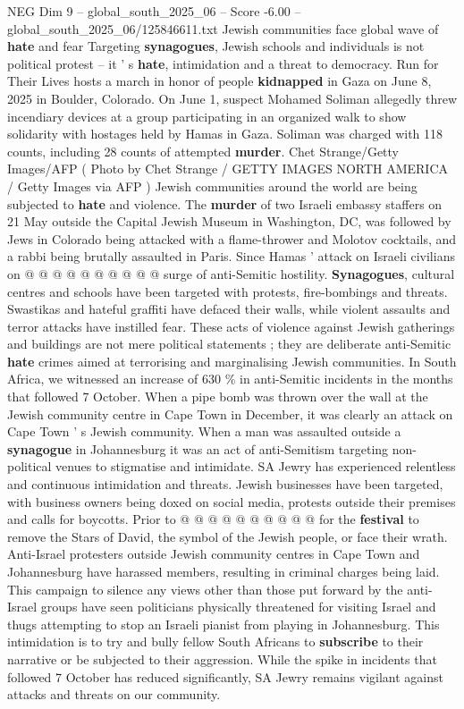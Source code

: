 \begin{textsample}{NEG Dim 9 – global\_south\_2025\_06 – Score -6.00 – global\_south\_2025\_06/125846611.txt}  \label{ex:f9_neg_252}
Jewish communities face global wave of \textbf{hate} and fear Targeting \textbf{synagogues}, Jewish schools and individuals is not political protest -- it ' s \textbf{hate}, intimidation and a threat to democracy.
Run for Their Lives hosts a march in honor of people \textbf{kidnapped} in Gaza on June 8, 2025 in Boulder, Colorado.
On June 1, suspect Mohamed Soliman allegedly threw incendiary devices at a group participating in an organized walk to show solidarity with hostages held by Hamas in Gaza.
Soliman was charged with 118 counts, including 28 counts of attempted \textbf{murder}.
Chet Strange/Getty Images/AFP ( Photo by Chet Strange / GETTY IMAGES NORTH AMERICA / Getty Images via AFP ) Jewish communities around the world are being subjected to \textbf{hate} and violence.
The \textbf{murder} of two Israeli embassy staffers on 21 May outside the Capital Jewish Museum in Washington, DC, was followed by Jews in Colorado being attacked with a flame-thrower and Molotov cocktails, and a rabbi being brutally assaulted in Paris.
Since Hamas ' attack on Israeli civilians on @ @ @ @ @ @ @ @ @ @ surge of anti-Semitic hostility. \textbf{Synagogues}, cultural centres and schools have been targeted with protests, fire-bombings and threats.
Swastikas and hateful graffiti have defaced their walls, while violent assaults and terror attacks have instilled fear.
These acts of violence against Jewish gatherings and buildings are not mere political statements ; they are deliberate anti-Semitic \textbf{hate} crimes aimed at terrorising and marginalising Jewish communities.
In South Africa, we witnessed an increase of 630 \% in anti-Semitic incidents in the months that followed 7 October.
When a pipe bomb was thrown over the wall at the Jewish community centre in Cape Town in December, it was clearly an attack on Cape Town ' s Jewish community.
When a man was assaulted outside a \textbf{synagogue} in Johannesburg it was an act of anti-Semitism targeting non-political venues to stigmatise and intimidate.
SA Jewry has experienced relentless and continuous intimidation and threats.
Jewish businesses have been targeted, with business owners being doxed on social media, protests outside their premises and calls for boycotts.
Prior to @ @ @ @ @ @ @ @ @ @ for the \textbf{festival} to remove the Stars of David, the symbol of the Jewish people, or face their wrath.
Anti-Israel protesters outside Jewish community centres in Cape Town and Johannesburg have harassed members, resulting in criminal charges being laid.
This campaign to silence any views other than those put forward by the anti-Israel groups have seen politicians physically threatened for visiting Israel and thugs attempting to stop an Israeli pianist from playing in Johannesburg.
This intimidation is to try and bully fellow South Africans to \textbf{subscribe} to their narrative or be subjected to their aggression.
While the spike in incidents that followed 7 October has reduced significantly, SA Jewry remains vigilant against attacks and threats on our community.

\end{textsample}
